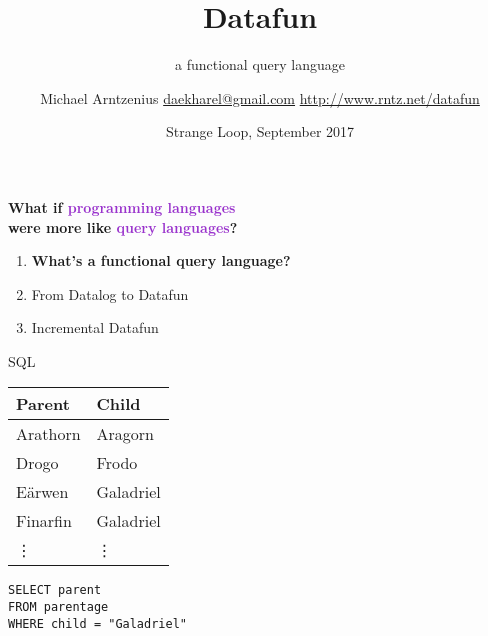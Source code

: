 \documentclass[xcolor=table,usenames,dvipsnames,svgnames]{beamer}
\title{Datafun}
\subtitle{a functional query language}
\author{Michael Arntzenius
  \newline\href{mailto:daekharel@gmail.com}{daekharel@gmail.com}
  \newline\url{http://www.rntz.net/datafun}}
\date{Strange Loop, September 2017}
\begin{document}
\maketitle


\begin{frame}\LARGE \centering
  \textbf{What if \textcolor{DarkOrchid}{programming languages}\\
    were more like \textcolor{DarkOrchid}{query languages}?}


\end{frame}

\begin{frame}\Large
  \begin{enumerate}
    \itemsep 1.5em
  \item {\bf What's a functional query language?}
  \item From Datalog to Datafun
  \item Incremental Datafun
  \end{enumerate}
\end{frame}


\begin{frame}{SQL}\large
  \begin{minipage}{0.4\textwidth}
    \centering
    \begin{tabular}{l|l}
      \textbf{Parent} & \textbf{Child}\\\hline
      Arathorn & Aragorn\\
      Drogo & Frodo\\
      E\"arwen & Galadriel\\
      Finarfin & Galadriel\\
      \rowcolor{white}
      \hfill\vdots & \hfill\vdots
    \end{tabular}
  \end{minipage}
  \hfill
  \begin{minipage}{0.51\textwidth}
    \texttt{SELECT parent\\FROM parentage\\WHERE child = "Galadriel"}
  \end{minipage}
\end{frame}
\end{document}
